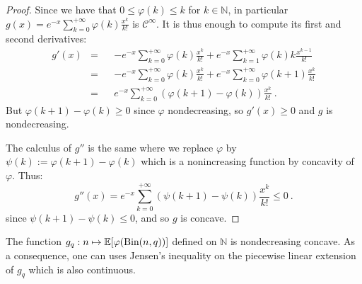 \begin{proof}
  Since we have that $0 \leq \varphi(k) \leq k$ for $k \in \mathbb{N}$, in particular $g(x) = e^{-x}\sum_{k=0}^{+\infty} \varphi(k)\frac{x^k}{k!}$ is $\mathcal{C}^{\infty}$. It is thus enough to compute its first and second derivatives:
  \begin{equation}
    \begin{aligned}
      g'(x) &=&& -e^{-x}\sum_{k=0}^{+\infty}\varphi(k)\frac{x^k}{k!}+ e^{-x}\sum_{k=1}^{+\infty}\varphi(k)k\frac{x^{k-1}}{k!}\\
      &=&& -e^{-x}\sum_{k=0}^{+\infty}\varphi(k)\frac{x^k}{k!}+ e^{-x}\sum_{k=0}^{+\infty}\varphi(k+1)\frac{x^{k}}{k!}\\
      &=&& e^{-x}\sum_{k=0}^{+\infty}(\varphi(k+1) -\varphi(k))\frac{x^k}{k!} \ .
    \end{aligned}
  \end{equation}
  But $\varphi(k+1) -\varphi(k) \geq 0$ since $\varphi$ nondecreasing, so $g'(x) \geq 0$ and $g$ is nondecreasing.

  
  The calculus of $g''$ is the same where we replace $\varphi$ by $\psi(k) := \varphi(k+1) -\varphi(k)$ which is a nonincreasing function by concavity of $\varphi$. Thus:
  \[g''(x) = e^{-x}\sum_{k=0}^{+\infty}(\psi(k+1) -\psi(k))\frac{x^k}{k!} \leq 0\ .\]
  since $\psi(k+1) -\psi(k) \leq 0$, and so $g$ is concave.
\end{proof}


\begin{proposition}
  The function $g_q : n \mapsto \mathbb{E}[\varphi(\operatorname{\text{Bin}}(n,q))]$ defined on $\mathbb{N}$ is nondecreasing concave. As a consequence, one can uses Jensen's inequality on the piecewise linear extension of $g_q$ which is also continuous.
  \label{prop:BinCon}
\end{proposition}

